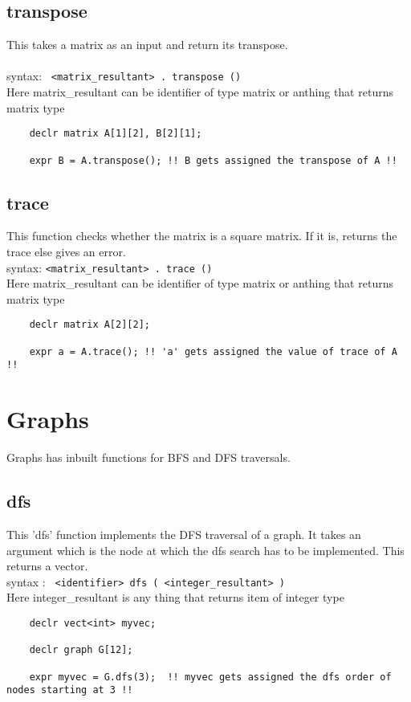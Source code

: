 \documentclass[journal, 18pt]{report}
\begin{document}
\subsection{transpose}
This takes a matrix as an input and return its transpose.\\\\
syntax: \texttt{ <matrix\_resultant> . transpose () }\\
Here matrix\_resultant can be identifier of type matrix or anthing that returns matrix type
\begin{lstlisting}
    declr matrix A[1][2], B[2][1];

    expr B = A.transpose(); !! B gets assigned the transpose of A !!
\end{lstlisting}
\subsection{trace}
This function checks whether the matrix is a square matrix. If it is, returns the trace else gives an error.\\
syntax: \texttt{<matrix\_resultant> . trace () }\\
Here matrix\_resultant can be identifier of type matrix or anthing that returns matrix type
\begin{lstlisting}
    declr matrix A[2][2]; 

    expr a = A.trace(); !! 'a' gets assigned the value of trace of A !!
\end{lstlisting}
\section{Graphs}
Graphs has inbuilt functions for BFS and DFS traversals.
\subsection{dfs}
This 'dfs' function implements the DFS traversal of a graph. It takes an argument which is the node at which the dfs search has to be implemented. This returns a vector.\\
syntax : \texttt{ <identifier> dfs ( <integer\_resultant> ) }\\
Here integer\_resultant is any thing that returns item of integer type
\begin{lstlisting}
    declr vect<int> myvec;
    
    declr graph G[12];
    
    expr myvec = G.dfs(3);  !! myvec gets assigned the dfs order of nodes starting at 3 !!
\end{lstlisting}
\end{document}
